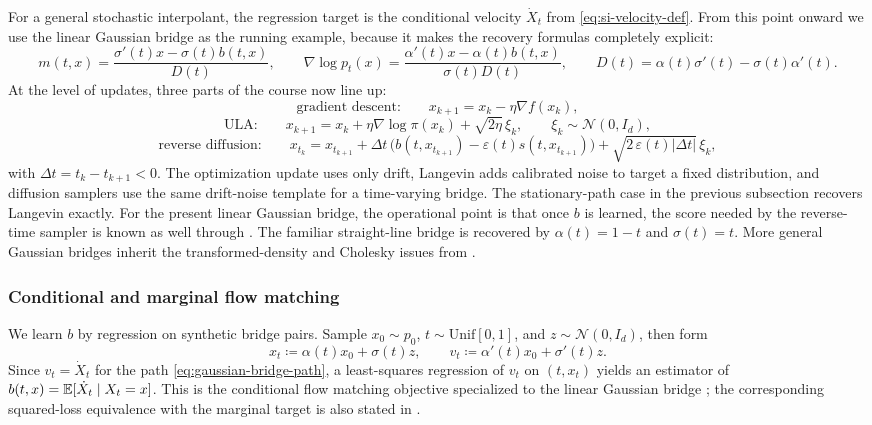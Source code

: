 For a general stochastic interpolant, the regression target is the conditional velocity $\dot X_t$ from \eqref{eq:si-velocity-def}.
From this point onward we use the linear Gaussian bridge as the running example, because it makes the recovery formulas completely explicit:
\[
  m(t,x)=\frac{\sigma'(t)x-\sigma(t)b(t,x)}{D(t)},
  \qquad
  \nabla\log p_t(x)=\frac{\alpha'(t)x-\alpha(t)b(t,x)}{\sigma(t)D(t)},
  \qquad
  D(t)=\alpha(t)\sigma'(t)-\sigma(t)\alpha'(t).
\]
At the level of updates, three parts of the course now line up:
\[
  \text{gradient descent:}\qquad x_{k+1}=x_k-\eta \nabla f(x_k),
\]
\[
  \text{ULA:}\qquad x_{k+1}=x_k+\eta \nabla\log \pi(x_k)+\sqrt{2\eta}\,\xi_k,
  \qquad \xi_k\sim\mathcal{N}(0,I_d),
\]
\[
  \text{reverse diffusion:}\qquad
  x_{t_k}
  =
  x_{t_{k+1}}
  +
  \Delta t\,\bigl(b(t,x_{t_{k+1}})-\varepsilon(t)s(t,x_{t_{k+1}})\bigr)
  +
  \sqrt{2\,\varepsilon(t)|\Delta t|}\,\xi_k,
\]
with $\Delta t=t_k-t_{k+1}<0$.
The optimization update uses only drift, Langevin adds calibrated noise to target a fixed distribution, and diffusion samplers use the same drift-noise template for a time-varying bridge.
The stationary-path case in the previous subsection recovers Langevin exactly.
For the present linear Gaussian bridge, the operational point is that once \(b\) is learned, the score needed by the reverse-time sampler is known as well through .
The familiar straight-line bridge is recovered by $\alpha(t)=1-t$ and $\sigma(t)=t$.
More general Gaussian bridges inherit the transformed-density and Cholesky issues from .

\subsubsection{Conditional and marginal flow matching}

We learn \(b\) by regression on synthetic bridge pairs.
Sample \(x_0\sim p_0\), \(t\sim\mathrm{Unif}[0,1]\), and \(z\sim\mathcal{N}(0,I_d)\), then form
\[
  x_t \coloneqq \alpha(t)x_0+\sigma(t)z,
  \qquad
  v_t \coloneqq \alpha'(t)x_0+\sigma'(t)z.
\]
Since $v_t=\dot X_t$ for the path \eqref{eq:gaussian-bridge-path}, a least-squares regression of $v_t$ on $(t,x_t)$ yields an estimator of $b(t,x)=\mathbb{E}[\dot X_t\mid X_t=x]$.
This is the conditional flow matching objective specialized to the linear Gaussian bridge \citep[\S3.2]{lipman_chen_ben_hamu_nickel_le_2023_flow_matching}; the corresponding squared-loss equivalence with the marginal target is also stated in \citet[Thm.~12]{holderrieth_erives_2026_intro_flow_matching}.

